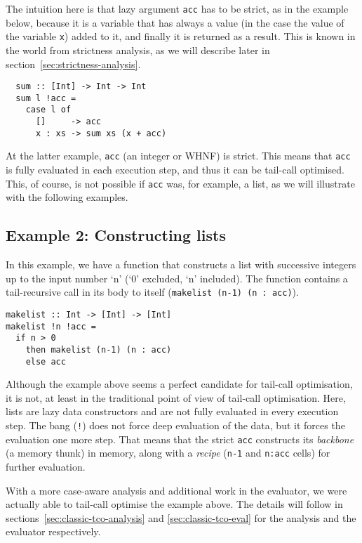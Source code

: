 \documentclass[diploma]{softlab-thesis}
\begin{document}
The intuition here is that lazy argument \texttt{acc} has to be strict, as in the example below,
because it is a variable that has always a value (in the case the value of the variable \texttt{x}) added to it,
and finally it is returned as a result. This is known in the world from strictness analysis, as we 
will describe later in section~\ref{sec:strictness-analysis}.

\begin{verbatim}
  sum :: [Int] -> Int -> Int
  sum l !acc = 
    case l of 
      []     -> acc 
      x : xs -> sum xs (x + acc) 
\end{verbatim}

At the latter example, \texttt{acc} (an integer or WHNF) is strict. This means that \texttt{acc} is 
fully evaluated in each execution step, and thus it can be tail-call optimised. This, of course,
is not possible if \texttt{acc} was, for example, a list, as we will illustrate with the following examples.


\subsection {Example 2: Constructing lists}
\label{sec:example2}

In this example, we have a function that constructs a list with successive 
integers up to the input number `n' (`0' excluded, `n' included). The function contains 
a tail-recursive call in its body to itself (\texttt{makelist (n-1) (n : acc)}). 

\begin{verbatim}
makelist :: Int -> [Int] -> [Int]
makelist !n !acc = 
  if n > 0 
    then makelist (n-1) (n : acc)
    else acc
\end{verbatim}

Although the example above seems a perfect candidate for tail-call optimisation, it is not, 
at least in the traditional point of view of tail-call optimisation. Here, lists are 
lazy data constructors and are not fully evaluated in every execution step. The bang (\texttt{!}) does not 
force deep evaluation of the data, but it forces the evaluation one more step. That means that the strict 
\texttt{acc} constructs its \textit{backbone} (a memory thunk) in memory, along with a \textit{recipe} 
(\texttt{n-1} and \texttt{n:acc} cells) for further evaluation. 

With a more case-aware analysis and additional work in the evaluator, 
we were actually able to tail-call optimise the example
above. The details will follow in sections~\ref{sec:classic-tco-analysis} and \ref{sec:classic-tco-eval} for the analysis 
and the evaluator respectively.
\end{document}
